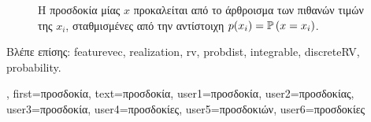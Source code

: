 {{\begin{figure}[H]
\begin{center}
			\end{center}
			\vspace*{-5mm}
		{
		\caption{\foreignlanguage{greek}{Η προσδοκία μίας}  $x$ \foreignlanguage{greek}{προκαλείται από το 
			άρθροισμα των πιθανών τιμών της $x_{i}$, σταθμισμένες από την αντίστοιχη}  $p(x_i) = \mathbb{P}\left(x= x_i\right)$. 
			\label{fig_expect_discrete_dict}} }
 		\end{figure}
		\foreignlanguage{greek}{Βλέπε επίσης:} \gls{featurevec}, \gls{realization}, \gls{rv}, \gls{probdist}, \gls{integrable}, 
		\gls{discreteRV}, \gls{probability}.},
 	first={\foreignlanguage{greek}{προσδοκία}},
 	text={\foreignlanguage{greek}{προσδοκία}},
	user1={\foreignlanguage{greek}{προσδοκία}}, %
 	user2={\foreignlanguage{greek}{προσδοκίας}}, %
 	user3={\foreignlanguage{greek}{προσδοκία}}, %
	user4={\foreignlanguage{greek}{προσδοκίες}}, %
 	user5={\foreignlanguage{greek}{προσδοκιών}}, %
 	user6={\foreignlanguage{greek}{προσδοκίες}} %
}

